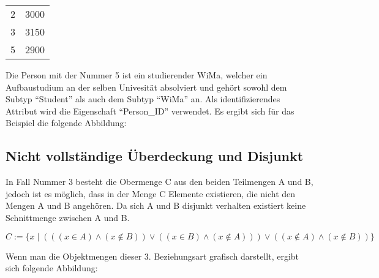\begin{supertabular}[h]{lp{5cm}}
    2 & 3000\\
    3 & 3150\\
    5 & 2900\\
\end{supertabular}

Die Person mit der Nummer 5 ist ein studierender WiMa, welcher ein Aufbaustudium an der selben Univesität absolviert und gehört sowohl dem Subtyp \enquote{Student} als auch dem Subtyp \enquote{WiMa} an. Als identifizierendes Attribut wird die Eigenschaft \enquote{Person\_ID} verwendet. Es ergibt sich für das Beispiel die folgende Abbildung:
\begin{center}
\end{center}
\vspace{\baselineskip}
\begin{center}
\end{center}
\subsection{Nicht vollständige Überdeckung und Disjunkt}
In Fall Nummer 3 besteht die Obermenge C aus den beiden Teilmengen A und B, jedoch ist es möglich, dass in der Menge C Elemente existieren, die nicht den Mengen A und B angehören. Da sich A und B disjunkt verhalten existiert keine Schnittmenge zwischen A und B.

$C := \{x \mid (((x \in A) \wedge (x \notin B)) \vee ((x \in B) \wedge (x \notin A))) \vee ((x \notin A) \wedge (x \notin B))\}$

Wenn man die Objektmengen dieser 3. Beziehungsart grafisch darstellt, ergibt sich folgende Abbildung:

